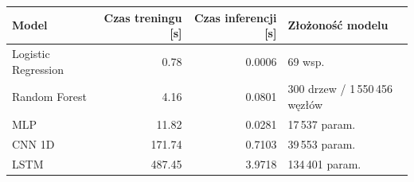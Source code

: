 \begin{tabular}{lrrl}
\toprule
Model & Czas treningu [s] & Czas inferencji [s] & Złożoność modelu \\
\midrule
Logistic Regression & 0.78 & 0.0006 & 69 wsp. \\
Random Forest & 4.16 & 0.0801 & 300 drzew / 1\,550\,456 węzłów \\
MLP & 11.82 & 0.0281 & 17\,537 param. \\
CNN 1D & 171.74 & 0.7103 & 39\,553 param. \\
LSTM & 487.45 & 3.9718 & 134\,401 param. \\
\bottomrule
\end{tabular}
